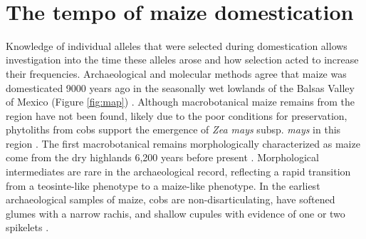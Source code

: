 \documentclass[a4paper]{article}
\begin{document}
 ﻿\section*{The tempo of maize domestication}

﻿Knowledge of individual alleles that were selected during domestication allows investigation into the time these alleles arose and how selection acted to increase their frequencies.
Archaeological and molecular methods agree that maize was domesticated 9000 years ago in the seasonally wet lowlands of the Balsas Valley of Mexico (Figure \ref{fig:map})  \citep{matsuoka2002, piperno2009, ranere2009}.
Although macrobotanical maize remains from the region have not been found, likely due to the poor conditions for preservation, phytoliths from cobs support the emergence of \textit{Zea mays} subsp. \textit{mays} in this region \citep{piperno2009}.
The first macrobotanical remains morphologically characterized as maize come from the dry highlands 6,200 years before present \citep{mangelsdorf1967, benz2001, piperno2001}.
﻿Morphological intermediates are rare in the archaeological record, reflecting a rapid transition from a teosinte-like phenotype to a maize-like phenotype.
In the earliest archaeological samples of maize, cobs are non-disarticulating, have softened glumes with a narrow rachis, and shallow cupules with evidence of one or two spikelets \citep{mangelsdorf1974, benz2001,  kennett2017}.
\end{document}
